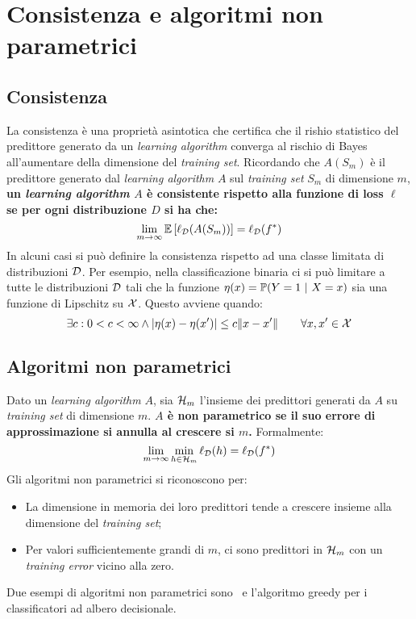 \section{Consistenza e algoritmi non parametrici}
\subsection{Consistenza}
La consistenza è una proprietà asintotica che certifica che il rishio statistico
del predittore generato da un \textit{learning algorithm} converga al rischio di
Bayes all'aumentare della dimensione del \textit{training set}. Ricordando che 
$A(S_m)$ è il predittore generato dal \textit{learning algorithm} $A$ sul
\textit{training set} $S_m$ di dimensione $m$, \textbf{un
\textit{learning algorithm} $A$ è consistente rispetto alla funzione di loss
$\ell$ se per ogni distribuzione $D$ si ha che:}
$$ \lim_{m\rightarrow\infty} \mathbb{E}\left[\ell_{\mathcal{D}}(A(S_m))\right]=\ell_{\mathcal{D}}(f^*) $$
In alcuni casi si può definire la consistenza rispetto ad una classe limitata di
distribuzioni $\mathcal{D}$. Per esempio, nella classificazione binaria ci si può limitare
a tutte le distribuzioni $\mathcal{D}$ tali che la funzione $\eta(x)=\mathbb{P}(Y=1 \ | \ X=x)$
sia una funzione di Lipschitz su $\mathcal{X}$. Questo avviene quando:
$$ \exists c: 0<c<\infty \wedge |\eta(x)-\eta(x')|\leq c\|x-x'\| 
\qquad \forall x,x' \in \mathcal{X}$$

\subsection{Algoritmi non parametrici}
Dato un \textit{learning algorithm} $A$, sia $\mathcal{H}_m$ l'insieme dei predittori
generati da $A$ su \textit{training set} di dimensione $m$. \textbf{$A$ è
non parametrico se il suo errore di approssimazione si annulla al crescere
si $m$.} Formalmente:
$$ \lim_{m\rightarrow\infty} \min_{h\in\mathcal{H}_m}\ell_{\mathcal{D}}(h)=\ell_{\mathcal{D}}(f^*) $$
Gli algoritmi non parametrici si riconoscono per:
\begin{itemize}
    \item La dimensione in memoria dei loro predittori tende a crescere insieme
        alla dimensione del \textit{training set};
    \item Per valori sufficientemente grandi di $m$, ci sono predittori in
        $\mathcal{H}_m$ con un \textit{training error} vicino alla zero.
\end{itemize}
Due esempi di algoritmi non parametrici sono \kNN \ e l'algoritmo greedy per
i classificatori ad albero decisionale.


